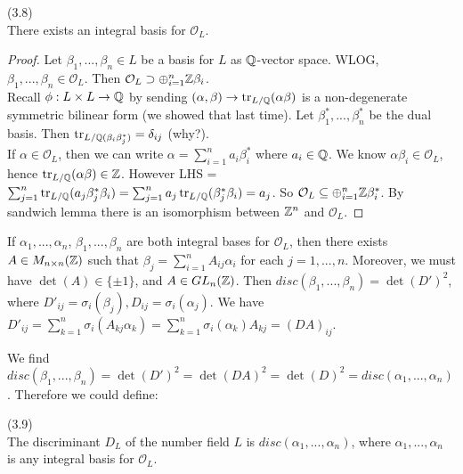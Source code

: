 \documentclass[a4paper]{article}
\begin{document}
\begin{prop} (3.8)\\
There exists an integral basis for $\mathcal{O}_L$.
\begin{proof}
Let $\beta_1,...,\beta_n \in L$ be a basis for $L$ as $\mathbb{Q}$-vector space. WLOG, $\beta_1,...,\beta_n \in \mathcal{O}_L$. Then $\mathcal{O}_L \supset \oplus_{i=1}^n \mathbb{Z} \beta_i$.\\
Recall $\phi:L \times L \to \mathbb{Q}$ by sending $(\alpha,\beta) \to \operatorname{tr}_{L/\mathbb{Q}} (\alpha\beta)$ is a non-degenerate symmetric bilinear form (we showed that last time). Let $\beta_1^*,...,\beta_n^*$ be the dual basis. Then $\operatorname{tr}_{L/\mathbb{Q}(\beta_i \beta_j^*)} = \delta_{ij}$ (why?).\\
If $\alpha \in \mathcal{O}_L$, then we can write $\alpha = \sum_{i=1}^n a_i \beta_i^*$ where $a_i \in \mathbb{Q}$. We know $\alpha\beta_i \in \mathcal{O}_L$, hence $\operatorname{tr}_{L/\mathbb{Q}} (\alpha\beta) \in \mathbb{Z}$. However LHS = $\sum_{j=1}^n \operatorname{tr}_{L/\mathbb{Q}} (a_j \beta_j^* \beta_i) = \sum_{j=1}^n a_j \operatorname{tr}_{L/\mathbb{Q}} (\beta_j^* \beta_i) = a_j$. So $\mathcal{O}_L \subseteq \oplus_{i=1}^n \mathbb{Z} \beta_i^*$. By sandwich lemma there is an isomorphism between $\mathbb{Z}^n$ and $\mathcal{O}_L$.
\end{proof}
\end{prop}

If $\alpha_1,...,\alpha_n$, $\beta_1,...,\beta_n$ are both integral bases for $\mathcal{O}_L$, then there exists $A \in M_{n \times n} (\mathbb{Z})$ such that $\beta_j = \sum_{i=1}^n A_{ij}\alpha_i$ for each $j=1,...,n$. Moreover, we must have $\det(A) \in \{\pm 1\}$, and $A \in GL_n(\mathbb{Z})$. Then $disc(\beta_1,...,\beta_n) = \det(D')^2$, where $D'_{ij} = \sigma_i(\beta_j), D_{ij} = \sigma_i(\alpha_j)$. We have $D'_{ij} = \sum_{k=1}^n \sigma_i (A_{kj} \alpha_k) = \sum_{k=1}^n \sigma_i (\alpha_k) A_{kj} = (DA)_{ij}$.

We find $disc(\beta_1,...,\beta_n) = \det(D')^2 = \det(DA)^2 = \det(D)^2 = disc(\alpha_1,...,\alpha_n)$. Therefore we could define:

\begin{defi} (3.9)\\
The discriminant $D_L$ of the number field $L$ is $disc(\alpha_1,...,\alpha_n)$, where $\alpha_1,...,\alpha_n$ is any integral basis for $\mathcal{O}_L$.
\end{defi}
\end{document}
